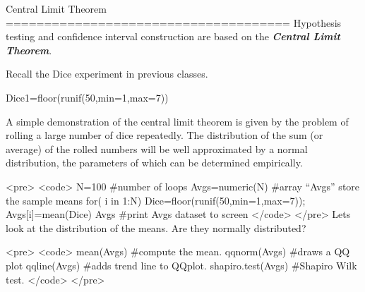 Central Limit Theorem
=====================================
Hypothesis testing and confidence interval construction are based on the \textbf{\textit{Central Limit Theorem}}.

Recall the Dice experiment in previous classes.

Dice1=floor(runif(50,min=1,max=7))  

A simple demonstration of the central limit theorem is given by the problem of rolling a large number of dice repeatedly. 
The distribution of the sum (or average) of the rolled numbers will be well approximated by a normal distribution, the parameters of which can be determined empirically.

<pre>
<code>
N=100            #number of loops
Avgs=numeric(N)  #array “Avgs” store the sample means
for( i in 1:N)
     { 
     Dice=floor(runif(50,min=1,max=7));
     Avgs[i]=mean(Dice)  
}                                 
Avgs            #print Avgs dataset to screen
</code>
</pre>
Lets look at the distribution of the means. Are they normally distributed?

<pre>
<code>
mean(Avgs)          #compute the mean. 
qqnorm(Avgs)        #draws a QQ plot
qqline(Avgs)        #adds trend line to QQplot.
shapiro.test(Avgs)  #Shapiro Wilk test. 
</code>
</pre>
